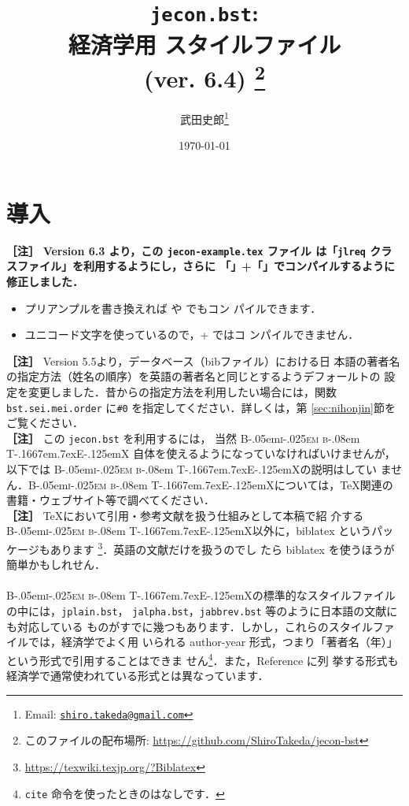 \documentclass[article]{jlreq}
\title{\texttt{jecon.bst}:\\ 経済学用 \BibTeX{} スタイルファイル\\ (ver. 6.4)
\thanks{このファイルの配布場所: \url{https://github.com/ShiroTakeda/jecon-bst}}
}
\author{武田史郎\thanks{Email: \texttt{\href{mailto:shiro.takeda@gmail.com}{shiro.takeda@gmail.com}}}}
\date{\today}
\newcommand{\BibTeX}{\textrm{B\kern-.05em\textsc{i\kern-.025em b}\kern-.08em%
T\kern-.1667em\lower.7ex\hbox{E}\kern-.125emX}}
\newcommand{\midashii}[1]{\noindent \textbf{［#1］}}
\begin{document}
\maketitle

\tableofcontents


\section{導入}

\midashii{注} \textbf{Version 6.3 より，この \texttt{jecon-example.tex} ファイル
は「\texttt{jlreq} クラスファイル」を利用するようにし，さらに
「\LuaLaTeX」+「\upBibTeX」でコンパイルするように修正しました．}
\begin{itemize}
 \item プリアンプルを書き換えれば \upLaTeX や \XeLaTeX でもコン
       パイルできます．
 \item ユニコード文字を使っているので，\pLaTeX + \pBibTeX ではコ
       ンパイルできません．
\end{itemize}
\vspace*{1em}

\midashii{注} Version 5.5より，データベース（bibファイル）における日
本語の著者名の指定方法（姓名の順序）を英語の著者名と同じとするようデフォールトの
設定を変更しました．昔からの指定方法を利用したい場合には，関数
\texttt{bst.sei.mei.order} に\verb|#0| を指定してください．詳しくは，第
\ref{sec:nihonjin}節をご覧ください．
\\

\midashii{注} この \texttt{jecon.bst} を利用するには， 当然 \BibTeX
自体を使えるようになっていなければいけませんが，以下では \BibTeX の説明はしてい
ません．\BibTeX については，\TeX 関連の書籍・ウェブサイト等で調べてください．\\

\midashii{注} \TeX において引用・参考文献を扱う仕組みとして本稿で紹
介する \BibTeX 以外に，biblatex というパッケージもあります
\footnote{\url{https://texwiki.texjp.org/?Biblatex}}．英語の文献だけを扱うのでし
たら biblatex を使うほうが簡単かもしれせん．
\\
\\

\BibTeX の標準的なスタイルファイルの中には，\texttt{jplain.bst}，
\texttt{jalpha.bst}，\texttt{jabbrev.bst} 等のように日本語の文献にも対応している
ものがすでに幾つもあります．しかし，これらのスタイルファイルでは，経済学でよく用
いられる author-year 形式，つまり「著者名（年）」という形式で引用することはできま
せん\footnote{\texttt{cite} 命令を使ったときのはなしです．}．また，Reference に列
挙する形式も経済学で通常使われている形式とは異なっています．
\end{document}
